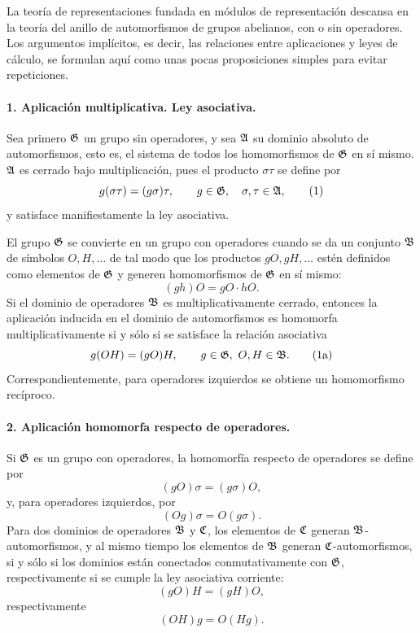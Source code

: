 La teoría de representaciones fundada en módulos de representación descansa en la teoría del anillo de automorfismos de grupos abelianos, con o sin operadores. Los argumentos implícitos, es decir, las relaciones entre aplicaciones y leyes de cálculo, se formulan aquí como unas pocas proposiciones simples para evitar repeticiones.

\paragraph{1. Aplicación multiplicativa. Ley asociativa.}
Sea primero \(\mathfrak G\) un grupo sin operadores, y sea \(\mathfrak A\) su dominio absoluto de automorfismos, esto es, el sistema de todos los homomorfismos de \(\mathfrak G\) en sí mismo. \(\mathfrak A\) es cerrado bajo multiplicación, pues el producto \(\sigma\tau\) se define por
\[
        g(\sigma\tau)=(g\sigma)\tau,
        \qquad g\in\mathfrak G,\quad \sigma,\tau\in\mathfrak A,                       \tag{1}
\]
y satisface manifiestamente la ley asociativa.

El grupo \(\mathfrak G\) se convierte en un grupo con operadores cuando se da un conjunto \(\mathfrak B\) de símbolos \(O,H,\ldots\) de tal modo que los productos \(gO,gH,\ldots\) estén definidos como elementos de \(\mathfrak G\) y generen homomorfismos de \(\mathfrak G\) en sí mismo:
\[
        (gh)O=gO\cdot hO.
\]
Si el dominio de operadores \(\mathfrak B\) es multiplicativamente cerrado, entonces la aplicación inducida en el dominio de automorfismos es homomorfa multiplicativamente si y sólo si se satisface la relación asociativa
\[
        g(OH)=(gO)H,\qquad g\in\frG,\ O,H\in\frB.                       \tag{1a}
\]
Correspondientemente, para operadores izquierdos se obtiene un homomorfismo recíproco.

\paragraph{2. Aplicación homomorfa respecto de operadores.}
Si \(\mathfrak G\) es un grupo con operadores, la homomorfía respecto de operadores se define por
\[
        (gO)\sigma=(g\sigma)O,                                          \tag{2}
\]
y, para operadores izquierdos, por
\[
        (Og)\sigma=O(g\sigma).                                          \tag{2*}
\]
Para dos dominios de operadores \(\mathfrak B\) y \(\mathfrak C\), los elementos de \(\mathfrak C\) generan \(\mathfrak B\)-automorfismos, y al mismo tiempo los elementos de \(\mathfrak B\) generan \(\mathfrak C\)-automorfismos, si y sólo si los dominios están conectados conmutativamente con \(\mathfrak G\), respectivamente si se cumple la ley asociativa corriente:
\[
        (gO)H=(gH)O,                                                    \tag{2a}
\]
respectivamente
\[
        (OH)g=O(Hg).                                                    \tag{2a*}
\]

